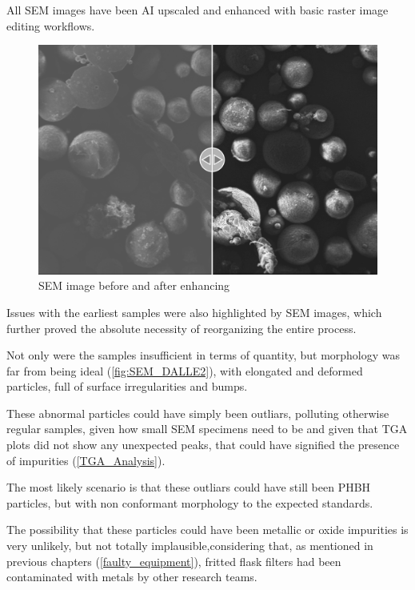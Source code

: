 \documentclass{article}
\begin{document}
            All SEM images have been AI upscaled and enhanced with basic raster image editing workflows. \\ 

                \begin{figure}[h!]
                    \centering
                    \includegraphics[width=\textwidth]{Pictures/SEM/Edited/unedited_vs_edited.png}
                    \caption{SEM image before and after enhancing \autocites{Inkscape}{Pixelmator_Pro}}
                    \label{fig:SEM_edited_vs_unedited}
                \end{figure}
                
            Issues with the earliest samples were also highlighted by SEM images, which further proved the absolute necessity of 
            reorganizing the entire process. 
            
            Not only were the samples insufficient in terms of quantity, but morphology was far from being ideal (\ref{fig:SEM_DALLE2}), with elongated and deformed particles, full of surface irregularities and bumps. 

            These abnormal particles could have simply been outliars, polluting otherwise 
            regular samples, given how small SEM specimens need to be and given that TGA plots did not show any unexpected peaks, that could have signified the presence of impurities (\ref{TGA_Analysis}). 

            The most likely scenario is that these outliars could have still been PHBH particles, but with non conformant morphology to the expected standards. 

            The possibility that these particles could have been metallic or oxide impurities is very unlikely, but not totally implausible,considering that, as mentioned in previous chapters (\ref{faulty_equipment}), fritted flask filters had been contaminated with metals by other research teams. 
\end{document}
